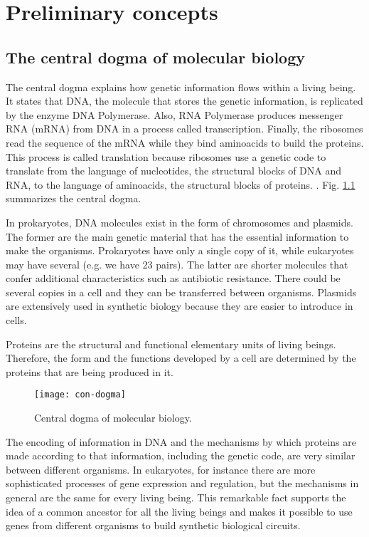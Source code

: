\chapter{Preliminary concepts}

\section{The central dogma of molecular biology}

The central dogma explains how genetic information flows within a living being. It states that DNA, the molecule that stores the genetic information, is replicated by the enzyme DNA Polymerase. Also, RNA Polymerase produces messenger RNA (mRNA) from DNA in a process called transcription. Finally, the ribosomes read the sequence of the mRNA while they bind aminoacids to build the proteins. This process is called translation because ribosomes use a genetic code to translate from the language of nucleotides, the structural blocks of DNA and RNA, to the language of aminoacids, the structural blocks of proteins. \cite{alberts13}. Fig. \ref{fig:con-dogma} summarizes the central dogma.

In prokaryotes, DNA molecules exist in the form of chromosomes and plasmids. The former are the main genetic material that has the essential information to make the organisms. Prokaryotes have only a single copy of it, while eukaryotes may have several (e.g. we have $23$ pairs). The latter are shorter molecules that confer additional characteristics such as antibiotic resistance. There could be several copies in a cell and they can be transferred between organisms. Plasmids are extensively used in synthetic biology because they are easier to introduce in cells.

Proteins are the structural and functional elementary units of living beings. Therefore, the form and the functions developed by a cell are determined by the proteins that are being produced in it.

\begin{figure}[H]
  \centering
  \texttt{[image: con-dogma]}
  \caption[Central dogma of molecular biology]{\label{fig:con-dogma} Central dogma of molecular biology.}
\end{figure}

The encoding of information in DNA and the mechanisms by which proteins are made according to that information, including the genetic code, are very similar between different organisms. In eukaryotes, for instance there are more sophisticated processes of gene expression and regulation, but the mechanisms in general are the same for every living being. This remarkable fact supports the idea of a common ancestor for all the living beings and makes it possible to use genes from different organisms to build synthetic biological circuits.

